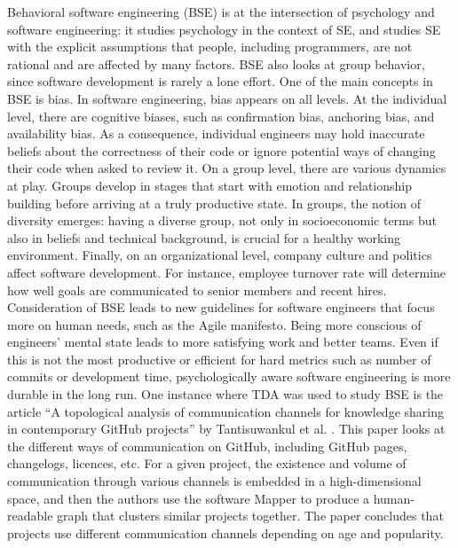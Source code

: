 \documentclass[11pt, oneside]{article}
\begin{document}
Behavioral software engineering (BSE) is at the intersection of psychology and software engineering: it studies psychology in the context of SE, and studies SE with the explicit assumptions that people, including programmers, are not rational and are affected by many factors. BSE also looks at group behavior, since software development is rarely a lone effort. One of the main concepts in BSE is bias. In software engineering, bias appears on all levels. At the individual level, there are cognitive biases, such as confirmation bias, anchoring bias, and availability bias. As a consequence, individual engineers may hold inaccurate beliefs about the correctness of their code or ignore potential ways of changing their code when asked to review it. On a group level, there are various dynamics at play. Groups develop in stages that start with emotion and relationship building before arriving at a truly productive state. In groups, the notion of diversity emerges: having a diverse group, not only in socioeconomic terms but also in beliefs and technical background, is crucial for a healthy working environment. Finally, on an organizational level, company culture and politics affect software development. For instance, employee turnover rate will determine how well goals are communicated to senior members and recent hires. Consideration of BSE leads to new guidelines for software engineers that focus more on human needs, such as the Agile manifesto. Being more conscious of engineers’ mental state leads to more satisfying work and better teams. Even if this is not the most productive or efficient for hard metrics such as number of commits or development time, psychologically aware software engineering is more durable in the long run. One instance where TDA was used to study BSE is the article “A topological analysis of communication channels for knowledge sharing in contemporary GitHub projects” by Tantisuwankul et al. \cite{T}. This paper looks at the different ways of communication on GitHub, including GitHub pages, changelogs, licences, etc. For a given project, the existence and volume of communication through various channels is embedded in a high-dimensional space, and then the authors use the software Mapper to produce a human-readable graph that clusters similar projects together. The paper concludes that projects use different communication channels depending on age and popularity.
\end{document}
